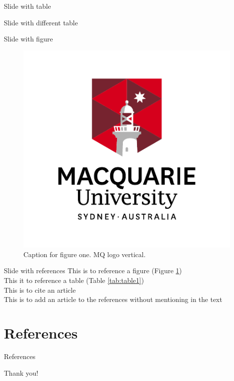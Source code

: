 \documentclass[aspectratio=169, 12pt]{beamer} %
\begin{document}
\begin{frame}{Slide with table}
  
\end{frame}

\begin{frame}{Slide with different table}
  
\end{frame}

\begin{frame}{Slide with figure}
  \begin{figure}[H]
    \centering
        \includegraphics[height=.7\textheight]{branding/MQ_INT_VER_RGB_POS.pdf}
        \caption{Caption for figure one. MQ logo vertical.}
        \label{fig:figure1}
  \end{figure}
\end{frame}

\begin{frame}{Slide with references}
  This is to reference a figure (Figure \ref{fig:figure1})\\
    This it to reference a table (Table \ref{tab:table1})\\
    This is to cite an article \cite{Sobotkova2015-lq, Nosek2018-yv}\\
    This is to add an article to the references without mentioning in the text \nocite{Borgman2015-rh, Center_for_Open_Science2018-pn}\\
\end{frame}
\section{References}

\begin{frame}[allowframebreaks]{References}
  \tiny
  
  
\end{frame}


\begin{frame}[standout]
Thank you!
\end{frame}
\end{document}
